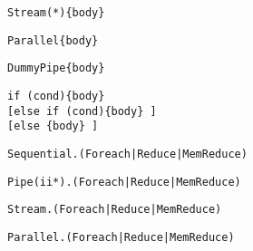 \begin{table*}
\newsavebox{\streamStar}
\begin{lrbox}{\streamStar}
\begin{lstlisting}[language=SpatialTable]
Stream(*){body}
\end{lstlisting}
\end{lrbox}

\newsavebox{\parallelSignature}
\begin{lrbox}{\parallelSignature}
\begin{lstlisting}[language=SpatialTable]
Parallel{body}
\end{lstlisting}
\end{lrbox}

\newsavebox{\pipeSignature}
\begin{lrbox}{\pipeSignature}
\begin{lstlisting}[language=SpatialTable]
DummyPipe{body}
\end{lstlisting}
\end{lrbox}

\newsavebox{\ifSignature}
\begin{lrbox}{\ifSignature}
\begin{lstlisting}[language=SpatialTable]
if (cond){body} 
[else if (cond){body} ] 
[else {body} ]
\end{lstlisting}
\end{lrbox}

\newsavebox{\sequentialTag}
\begin{lrbox}{\sequentialTag}
\begin{lstlisting}[language=SpatialTable]
Sequential.(Foreach|Reduce|MemReduce)
\end{lstlisting}
\end{lrbox}

\newsavebox{\pipeTag}
\begin{lrbox}{\pipeTag}
\begin{lstlisting}[language=SpatialTable]
Pipe(ii*).(Foreach|Reduce|MemReduce)
\end{lstlisting}
\end{lrbox}

\newsavebox{\streamTag}
\begin{lrbox}{\streamTag}
\begin{lstlisting}[language=SpatialTable]
Stream.(Foreach|Reduce|MemReduce)
\end{lstlisting}
\end{lrbox}

\newsavebox{\parallelTag}
\begin{lrbox}{\parallelTag}
\begin{lstlisting}[language=SpatialTable]
Parallel.(Foreach|Reduce|MemReduce)
\end{lstlisting}
\end{lrbox}


\end{table*}
